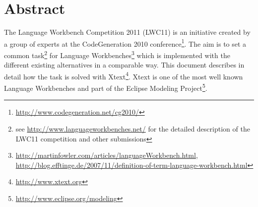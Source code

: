 \section*{Abstract}
The Language Workbench Competition 2011 (LWC11) is an initiative created by a
group of experts at the CodeGeneration 2010
conference\footnote{\url{http://www.codegeneration.net/cg2010/}}. The aim is to
set a common task\footnote{see \url{http://www.languageworkbenches.net/} for the
detailed description of the LWC11 competition and other submissions}
for Language Workbenches\footnote{\url{http://martinfowler.com/articles/languageWorkbench.html},
\url{http://blog.efftinge.de/2007/11/definition-of-term-language-workbench.html}}
which is implemented with the different existing alternatives in a comparable
way. This document describes in detail how the task is solved with
Xtext\footnote{\url{http://www.xtext.org}}. Xtext is one of the most well known
Language Workbenches and part of the Eclipse Modeling
Project\footnote{\url{http://www.eclipse.org/modeling}}.

